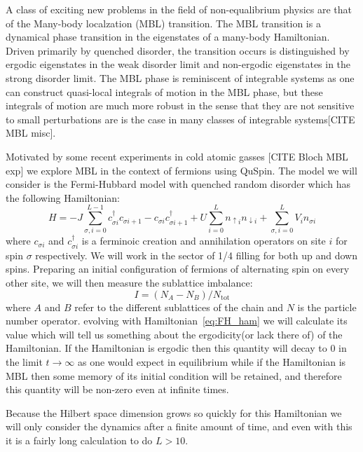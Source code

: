 \documentclass{SciPost}
\newcommand\0{\scalebox{-1}[1]{0}}
\begin{document}
A class of exciting new problems in the field of non-equalibrium physics are that of the Many-body localzation (MBL) transition. The MBL transition is a dynamical phase transition in the eigenstates of a many-body Hamiltonian. Driven primarily by quenched disorder, the transition occurs is distinguished by ergodic eigenstates in the weak disorder limit and non-ergodic eigenstates in the strong disorder limit. The MBL phase is reminiscent of integrable systems as one can construct quasi-local integrals of motion in the MBL phase, but these integrals of motion are much more robust in the sense that they are not sensitive to small perturbations are is the case in many classes of integrable systems[CITE MBL misc].

Motivated by some recent experiments in cold atomic gasses [CITE Bloch MBL exp] we explore MBL in the context of fermions using QuSpin. The model we will consider is the Fermi-Hubbard model with quenched random disorder which has the following Hamiltonian:
\begin{equation}
	H = -J\sum_{\sigma,i=0}^{L-1} c^\dagger_{\sigma i}c_{\sigma i+1} - c_{\sigma i}c^\dagger_{\sigma i+1} +U\sum_{i=0}^L n_{\uparrow i}n_{\downarrow i} + \sum_{\sigma, i=0}^L V_i n_{\sigma i}\label{eq:FH_ham}
\end{equation}
where $c_{\sigma i}$ and $c^\dagger_{\sigma i}$ is a ferminoic creation and annihilation operators on site $i$ for spin $\sigma$ respectively. We will work in the sector of 1/4 filling for both up and down spins. Preparing an initial configuration of fermions of alternating spin on every other site, we will then measure the sublattice imbalance:
\begin{equation}
	I = (N_A-N_B)/N_\mathrm{tot}
\end{equation}
where $A$ and $B$ refer to the different sublattices of the chain and $N$ is the particle number operator. evolving with Hamiltonian~\eqref{eq:FH_ham} we will calculate its value which will tell us something about the ergodicity(or lack there of) of the Hamiltonian. If the Hamiltonian is ergodic then this quantity will decay to $0$ in the limit $t\rightarrow\infty$ as one would expect in equilibrium while if the Hamiltonian is MBL then some memory of its initial condition will be retained, and therefore this quantity will be non-zero even at infinite times.

Because the Hilbert space dimension grows so quickly for this Hamiltonian we will only consider the dynamics after a finite amount of time, and even with this it is a fairly long calculation to do $L>10$. 
\end{document}
